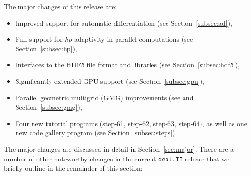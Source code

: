 \documentclass{ansarticle-preprint}
\newcommand{\specialword}[1]{\texttt{#1}}
\newcommand{\dealii}{{\specialword{deal.II}}\xspace}
\begin{document}
The major changes of this release are:
%
\begin{itemize}
  \item Improved support for automatic differentiation (see
    Section~\ref{subsec:ad}),
  \item Full support for $hp$ adaptivity in parallel computations (see
    Section~\ref{subsec:hp}),
  \item Interfaces to the HDF5 file format and libraries (see
    Section~\ref{subsec:hdf5}),
  \item Significantly extended GPU support (see Section~\ref{subsec:gpu}),
  \item Parallel geometric multigrid (GMG) improvements (see
    \cite{ClevengerHeisterKanschatKronbichler2019} and
    Section~\ref{subsec:gmg}),
  \item Four new tutorial programs (step-61, step-62, step-63, step-64),
    as well as one new code gallery program (see
    Section~\ref{subsec:steps}).
\end{itemize}
%
The major changes are discussed in detail in Section~\ref{sec:major}. There
are a number of other noteworthy changes in the current \dealii{} release
that we briefly outline in the remainder of this section:
%
\end{document}
